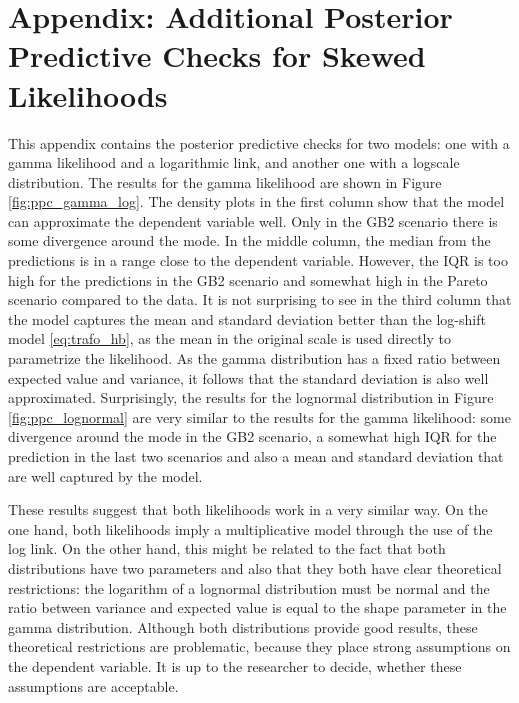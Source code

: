 \chapter{Appendix: Additional Posterior Predictive Checks for Skewed Likelihoods}
\label{appendix:ppc_skewed}

This appendix contains the posterior predictive checks for two models: one with a gamma likelihood and a logarithmic link, and another one with a logscale distribution.
The results for the gamma likelihood are shown in Figure \ref{fig:ppc_gamma_log}.
The density plots in the first column show that the model can approximate the dependent variable well.
Only in the GB2 scenario there is some divergence around the mode.
In the middle column, the median from the predictions is in a range close to the dependent variable.
However, the IQR is too high for the predictions in the GB2 scenario and somewhat high in the Pareto scenario compared to the data.
It is not surprising to see in the third column that the model captures the mean and standard deviation better than the log-shift model \ref{eq:trafo_hb}, as the mean in the original scale is used directly to parametrize the likelihood.
As the gamma distribution has a fixed ratio between expected value and variance, it follows that the standard deviation is also well approximated.
Surprisingly, the results for the lognormal distribution in Figure \ref{fig:ppc_lognormal} are very similar to the results for the gamma likelihood: some divergence around the mode in the GB2 scenario, a somewhat high IQR for the prediction in the last two scenarios and also a mean and standard deviation that are well captured by the model.

These results suggest that both likelihoods work in a very similar way.
On the one hand, both likelihoods imply a multiplicative model through the use of the log link.
On the other hand, this might be related to the fact that both distributions have two parameters and also that they both have clear theoretical restrictions: the logarithm of a lognormal distribution must be normal and the ratio between variance and expected value is equal to the shape parameter in the gamma distribution.
Although both distributions provide good results, these theoretical restrictions are problematic, because they place strong assumptions on the dependent variable.
It is up to the researcher to decide, whether these assumptions are acceptable.


